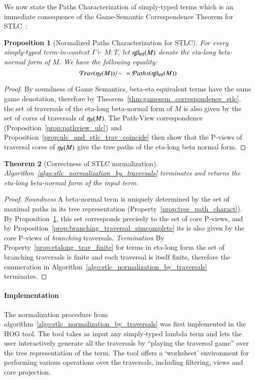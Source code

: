 \documentclass{elsarticle}
\theoremstyle{plain}
\newtheorem{theorem}{Theorem}[section]
\newtheorem{proposition}[theorem]{Proposition}
\theoremstyle{definition}
\theoremstyle{remark}
\newcommand{\travulc}{\travset}
\newcommand\pathset{{\mathcal{P}aths}} %
\begin{document}
We now state the Paths Characterization of simply-typed terms which is an immediate consequence of the Game-Semantic Correspondence Theorem for STLC~\cite{BlumPhd}:
\begin{proposition}[Normalized Paths Characterization for STLC]
\label{prop:path_charact_stlc}
For every simply-typed term-in-context $\Gamma\vdash M :T$, let $\eta\beta_{\sf lnf}(M)$ denote the eta-long beta-normal form of $M$. We have the following equality:
\begin{equation*}
\travulc(\etalf{M})/{\sim}\ = \pathset(\etabetalnf{M})
\end{equation*}
\end{proposition}
\begin{proof}
 By soundness of Game Semantics, beta-eta equivalent terms have the same game denotation, therefore by Theorem~\ref{thm:gamesem_correspondence_stlc}, the set of traversals of the eta-long beta-normal form of $M$ is also given by the set of cores of traversals of $\eta_{\sf lf}(M)$. The Path-View correspondence (Proposition~\ref{prop:pathview_ulc}) and Proposition~\ref{prop:ulc_and_stlc_trav_coincide} then show that the P-views of traversal cores of $\eta_{\sf lf}(M)$ give the tree paths of the eta-long beta normal form.
\end{proof}



\begin{theorem}[Correctness of STLC normalization]
Algorithm~\ref{algo:stlc_normalization_by_traversals} terminates and returns the eta-long beta-normal form of the input term.
\end{theorem}
\begin{proof}
\emph{Soundness} A beta-normal term is uniquely determined by the set of maximal paths in its tree representation (Property~\ref{prop:tree_path_charact}). By Proposition~\ref{prop:path_charact_stlc}, this set corresponds precisely to the set of core P-views,
and by Proposition~\ref{prop:branching_traversal_simcomplete} its is also given by the core P-views of \emph{branching} traversals.
\emph{Termination} By Property~\ref{prop:etalong_trav_finite} for terms in eta-long form the set of branching traversals is finite and each traversal is itself finite, therefore the enumeration in Algorithm~\ref{algo:stlc_normalization_by_traversals} terminates.
\end{proof}


\paragraph{Implementation} The normalization procedure from algorithm~\ref{algo:stlc_normalization_by_traversals} was first implemented in the HOG tool\cite{BlumGalop2008, BlumPhd}. The tool takes as input any simply-typed lambda term and lets the user interactively generate all the traversals by ``playing the traversal game'' over the tree representation of the term. The tool offers a `worksheet' environment for performing various operations over the traversals, including filtering, views and core projection.
\end{document}

